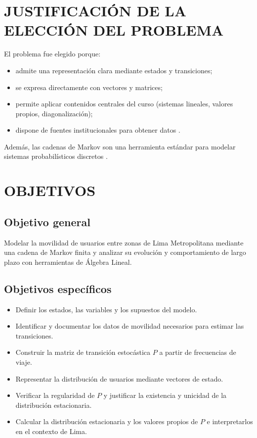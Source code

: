 \documentclass[12pt]{article}
\begin{document}
\section{JUSTIFICACIÓN DE LA ELECCIÓN DEL PROBLEMA}
El problema fue elegido porque:
\begin{itemize}
    \item admite una representación clara mediante estados y transiciones;
    \item se expresa directamente con vectores y matrices;
    \item permite aplicar contenidos centrales del curso (sistemas lineales, valores propios,
          diagonalización);
    \item dispone de fuentes institucionales para obtener datos \cite{atu,inei}.
\end{itemize}
Además, las cadenas de Markov son una herramienta estándar para modelar sistemas probabilísticos
discretos \cite{norris,ross}.
\newpage

\section{OBJETIVOS}
\subsection{Objetivo general}
Modelar la movilidad de usuarios entre zonas de Lima Metropolitana mediante una cadena de Markov
finita y analizar su evolución y comportamiento de largo plazo con herramientas de Álgebra Lineal.

\subsection{Objetivos específicos}
\begin{itemize}
    \item Definir los estados, las variables y los supuestos del modelo.
    \item Identificar y documentar los datos de movilidad necesarios para estimar las transiciones.
    \item Construir la matriz de transición estocástica $P$ a partir de frecuencias de viaje.
    \item Representar la distribución de usuarios mediante vectores de estado.
    \item Verificar la regularidad de $P$ y justificar la existencia y unicidad de la distribución
          estacionaria.
    \item Calcular la distribución estacionaria y los valores propios de $P$ e interpretarlos en el
          contexto de Lima.
\end{itemize}
\end{document}

